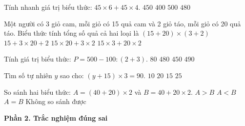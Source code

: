 \begin{ex} %
Tính nhanh giá trị biểu thức: $45 \times 6 + 45 \times 4$.
\choice
{\True $450$}
{$400$}
{$500$}
{$480$}
\end{ex}

\begin{ex} %
Một người có 3 giỏ cam, mỗi giỏ có 15 quả cam và 2 giỏ táo, mỗi giỏ có 20 quả táo. Biểu thức tính tổng số quả cả hai loại là
\choice
{$(15 + 20) \times (3 + 2)$}
{$15 + 3 \times 20 + 2$}
{$15 \times 20 + 3 \times 2$}
{\True $15 \times 3 + 20 \times 2$}
\end{ex}

\begin{ex} %
Tính giá trị biểu thức: $P = 500 - 100 : (2 + 3)$.
\choice
{$80$}
{\True $480$}
{$450$}
{$490$}
\end{ex}

\begin{ex} %
Tìm số tự nhiên $y$ sao cho: $(y + 15) \times 3 = 90$.
\choice
{$10$}
{$20$}
{\True $15$}
{$25$}
\end{ex}

\begin{ex} %
So sánh hai biểu thức: $A = (40 + 20) \times 2$ và $B = 40 + 20 \times 2$.
\choice
{\True $A > B$}
{$A < B$}
{$A = B$}
{Không so sánh được}
\end{ex}

\textbf{Phần 2. Trắc nghiệm đúng sai}

